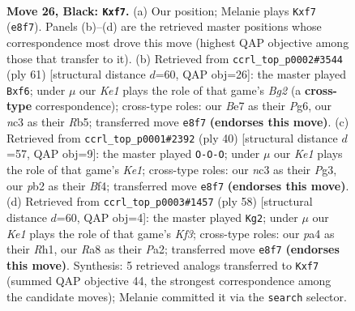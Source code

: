 \documentclass[11pt]{article}
\begin{document}
\clearpage

\begin{figure}[p]\centering
\begin{subfigure}{0.46\textwidth}\centering
\resizebox{\linewidth}{!}{%
\newchessgame
\chessboard[
  setfen={r3k3/p3bR2/2p3p1/6P1/P7/2N2N2/1P3P2/R1B1K3 b Q - 0 26},
  showmover=false,
  pgfstyle=straightmove, color=movearrow, markmove={e8-f7}
]}
\caption{}
\end{subfigure}\hfill
\begin{subfigure}{0.46\textwidth}\centering
\resizebox{\linewidth}{!}{%
\newchessgame
\chessboard[
  setfen={6k1/6b1/2p2Rp1/1r1p4/3P2P1/1P1R1N2/5P2/6K1 b - - 0 31},
  showmover=false,
  pgfstyle=straightmove, color=movearrow, markmove={g7-f6}
]}
\caption{}
\end{subfigure}
\\[4pt]
\begin{subfigure}{0.46\textwidth}\centering
\resizebox{\linewidth}{!}{%
\newchessgame
\chessboard[
  setfen={B1b1k2r/p2p1p1p/2n5/1p6/5B2/1P4P1/1PP5/R3K3 w Qk - 1 21},
  showmover=false,
  pgfstyle=straightmove, color=movearrow, markmove={e1-c1}
]}
\caption{}
\end{subfigure}\hfill
\begin{subfigure}{0.46\textwidth}\centering
\resizebox{\linewidth}{!}{%
\newchessgame
\chessboard[
  setfen={4r1kb/4pp1p/6p1/4n1B1/1R4PP/5K2/P1P5/7R w - - 0 30},
  showmover=false,
  pgfstyle=straightmove, color=movearrow, markmove={f3-g2}
]}
\caption{}
\end{subfigure}
\caption{\textbf{Move 26, Black: \texttt{Kxf7}.} (a) Our position; Melanie plays \texttt{Kxf7} (\texttt{e8f7}). Panels (b)--(d) are the retrieved master positions whose correspondence most drove this move (highest QAP objective among those that transfer to it). (b) Retrieved from \texttt{ccrl\_top\_p0002\#3544} (ply 61) [structural distance $d$=60, QAP obj=26]: the master played \texttt{Bxf6}; under $\mu$ our \emph{Ke1} plays the role of that game's \emph{Bg2} (a \textbf{cross-type} correspondence); cross-type roles: our \emph{B}e7 as their \emph{P}g6, our \emph{n}c3 as their \emph{R}b5; transferred move \texttt{e8f7} \textbf{(endorses this move)}. (c) Retrieved from \texttt{ccrl\_top\_p0001\#2392} (ply 40) [structural distance $d$=57, QAP obj=9]: the master played \texttt{O-O-O}; under $\mu$ our \emph{Ke1} plays the role of that game's \emph{Ke1}; cross-type roles: our \emph{n}c3 as their \emph{P}g3, our \emph{p}b2 as their \emph{B}f4; transferred move \texttt{e8f7} \textbf{(endorses this move)}. (d) Retrieved from \texttt{ccrl\_top\_p0003\#1457} (ply 58) [structural distance $d$=60, QAP obj=4]: the master played \texttt{Kg2}; under $\mu$ our \emph{Ke1} plays the role of that game's \emph{Kf3}; cross-type roles: our \emph{p}a4 as their \emph{R}h1, our \emph{R}a8 as their \emph{P}a2; transferred move \texttt{e8f7} \textbf{(endorses this move)}. Synthesis: 5 retrieved analogs transferred to \texttt{Kxf7} (summed QAP objective 44, the strongest correspondence among the candidate moves); Melanie committed it via the \texttt{search} selector.}
\label{fig:thought-m51}
\end{figure}
\end{document}
